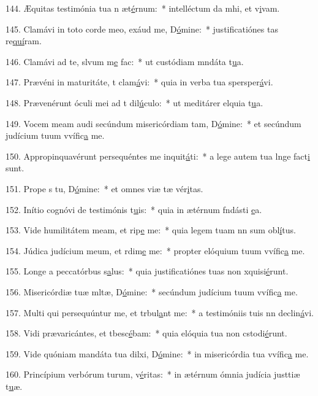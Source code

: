 144. Æquitas testimónia tua n æt\uline{é}rnum:~* intelléctum da mhi, et v\uline{i}vam.\par 
145. Clamávi in toto corde meo, exáud me, D\uline{ó}mine:~* justificatiónes tas re\uline{quí}ram.\par 
146. Clamávi ad te, slvum m\uline{e} fac:~* ut custódiam mndáta t\uline{u}a.\par 
147. Prævéni in maturitáte, t clam\uline{á}vi:~* quia in verba tua spersper\uline{á}vi.\par 
148. Prævenérunt óculi mei ad t dil\uline{ú}culo:~* ut meditárer elquia t\uline{u}a.\par 
149. Vocem meam audi secúndum misericórdiam tam, D\uline{ó}mine:~* et secúndum judícium tuum vvífic\uline{a} me.\par 
150. Appropinquavérunt persequéntes me inquit\uline{á}ti:~* a lege autem tua lnge fact\uline{i} sunt.\par 
151. Prope s tu, D\uline{ó}mine:~* et omnes viæ tæ vér\uline{i}tas.\par 
152. Inítio cognóvi de testimónis t\uline{u}is:~* quia in ætérnum fndásti \uline{e}a.\par 
153. Vide humilitátem meam, et rip\uline{e} me:~* quia legem tuam nn sum obl\uline{í}tus.\par 
154. Júdica judícium meum, et rdim\uline{e} me:~* propter elóquium tuum vvífic\uline{a} me.\par 
155. Longe a peccatórbus s\uline{a}lus:~* quia justificatiónes tuas non xquisi\uline{é}runt.\par 
156. Misericórdiæ tuæ mltæ, D\uline{ó}mine:~* secúndum judícium tuum vvífic\uline{a} me.\par 
157. Multi qui persequúntur me, et trbul\uline{a}nt me:~* a testimóniis tuis nn declin\uline{á}vi.\par 
158. Vidi prævaricántes, et tbesc\uline{é}bam:~* quia elóquia tua non cstodi\uline{é}runt.\par 
159. Vide quóniam mandáta tua dilxi, D\uline{ó}mine:~* in misericórdia tua vvífic\uline{a} me.\par 
160. Princípium verbórum turum, v\uline{é}ritas:~* in ætérnum ómnia judícia justtiæ t\uline{u}æ.\par 
